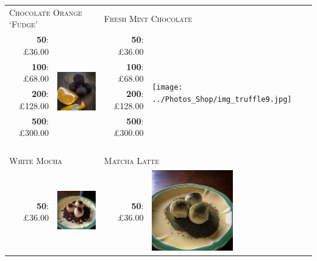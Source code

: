 \documentclass[11pt, english]{article}
\begin{document}
	\begin{table}[h]
	\begin{center}
	\begin{tabular}{r|p{4cm}r|p{4cm}}
		\multicolumn{2}{l}{\textsc{Chocolate Orange `Fudge'}} & \multicolumn{2}{l}{\textsc{Fresh Mint Chocolate}}\\
		\textbf{50}: \pounds36.00 & \multirow{8}{*}{\includegraphics[width=3.5cm,height=3.5cm]{../Photos_Shop/img_truffle8.jpg}} & \textbf{50}: \pounds36.00 & \multirow{8}{*}{\texttt{[image: ../Photos\_Shop/img\_truffle9.jpg]}}\\
		\textbf{100}: \pounds68.00 & & \textbf{100}: \pounds68.00 & \\
		\textbf{200}: \pounds128.00 & & \textbf{200}: \pounds128.00 & \\
		\textbf{500}: \pounds300.00 & & \textbf{500}: \pounds300.00 & \\
		\multicolumn{4}{l}{}\\
		\multicolumn{4}{l}{}\\
		\multicolumn{4}{l}{}\\
		\multicolumn{4}{l}{}\\
		\multicolumn{2}{l}{\textsc{White Mocha}} & \multicolumn{2}{l}{\textsc{Matcha Latte}}\\
		\textbf{50}: \pounds36.00 & \multirow{5}{*}{\includegraphics[width=3.5cm,height=3.5cm]{../Photos_Shop/img_truffle3.jpg}} & \textbf{50}: \pounds36.00 & \multirow{5}{*}{\includegraphics[width=3.5cm,height=3.5cm]{../Photos_Shop/img_truffle10.jpg}}\\

\end{tabular}
\end{center}
\end{table}
\end{document}
